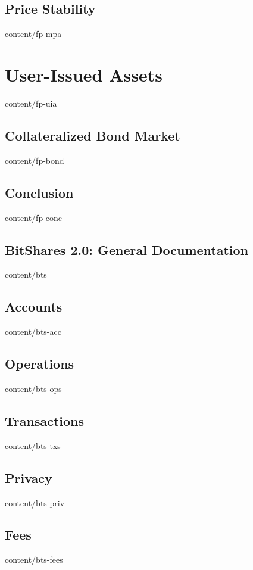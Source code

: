\documentclass[conference,final,10pt,a4paper]{IEEEtran}
\begin{document}
\subsection    { Price Stability                                  }  { content/fp-mpa        } 
\section       { User-Issued Assets                               }  { content/fp-uia        } 
\subsection    { Collateralized Bond Market                       }  { content/fp-bond       } 
\subsection    { Conclusion                                       }  { content/fp-conc       } 

\subsection    { BitShares 2.0: General Documentation             }  { content/bts           } 
\subsection    { Accounts                                         }  { content/bts-acc       } 
\subsection    { Operations                                       }  { content/bts-ops       } 
\subsection    { Transactions                                     }  { content/bts-txs       } 
\subsection    { Privacy                                          }  { content/bts-priv      } 
\subsection    { Fees                                             }  { content/bts-fees      } 
\end{document}
